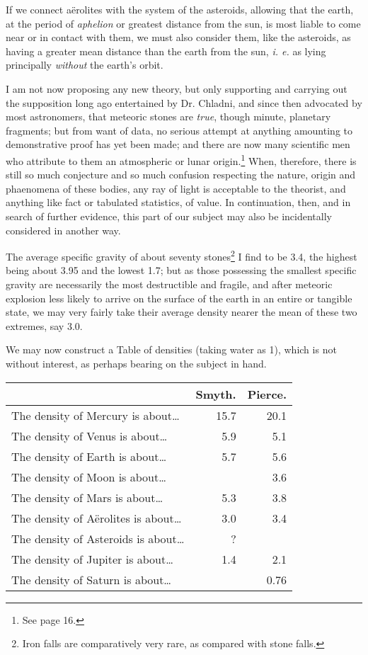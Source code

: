 \documentclass[a4paper, 12pt, oneside]{article}
\begin{document}
If we connect aërolites with the system of the asteroids, allowing that the earth, at the period of \emph{aphelion} or greatest distance from the sun, is most liable to come near or in contact with them, we must also consider them, like the asteroids, as having a greater mean distance than the earth from the sun, \emph{i. e.} as lying principally \emph{without} the earth's orbit.

I am not now proposing any new theory, but only supporting and carrying out the supposition long ago entertained by Dr. Chladni, and since then advocated by most astronomers, that meteoric stones are \emph{true}, though minute, planetary fragments; but from want of data, no serious attempt at anything amounting to demonstrative proof has yet been made; and there are now many scientific men who attribute to them an atmospheric or lunar origin.\footnote{See page 16.} When, therefore, there is still so much conjecture and so much confusion respecting the nature, origin and phaenomena of these bodies, any ray of light is acceptable to the theorist, and anything like fact or tabulated statistics, of value. In continuation, then, and in search of further evidence, this part of our subject may also be incidentally considered in another way.

The average specific gravity of about seventy stones\footnote{Iron falls are comparatively very rare, as compared with stone falls.} I find to be 3.4, the highest being about 3.95 and the lowest 1.7; but as those possessing the smallest specific gravity are necessarily the most destructible and fragile, and after meteoric explosion less likely to arrive on the surface of the earth in an entire or tangible state, we may very fairly take their average density nearer the mean of these two extremes, say 3.0.

We may now construct a Table of densities (taking water as 1), which is not without interest, as perhaps bearing on the subject in hand.
\begin{table}[H]
    \centering
    \begin{tabular}{l r r}
    \hline
         ~ & Smyth. & Pierce. \\ \hline
        The density of Mercury is about… & 15.7 & 20.1 \\ \hline
        The density of Venus is about… & 5.9 & 5.1 \\ \hline
        The density of Earth is about… & 5.7 & 5.6 \\ \hline
        The density of Moon is about… & ~ & 3.6 \\ \hline
        The density of Mars is about… & 5.3 & 3.8 \\ \hline
        The density of Aërolites is about… & 3.0 & 3.4 \\ \hline
        The density of Asteroids is about… & ? & ~ \\ \hline
        The density of Jupiter is about… & 1.4 & 2.1 \\ \hline
        The density of Saturn is about… & ~ & 0.76 \\ \hline
    \end{tabular}
\end{table}     
\end{document}
